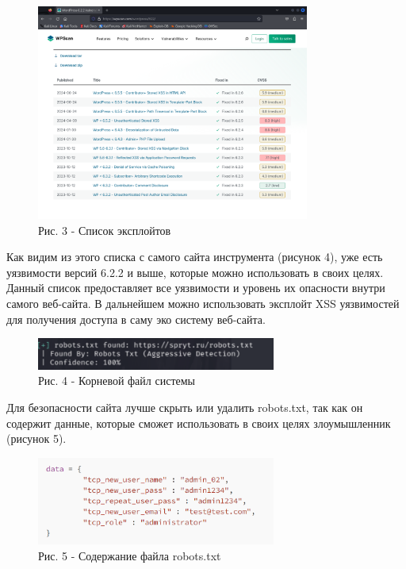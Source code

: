 \begin{figure}[H]
	\centering
	\includegraphics[width=0.8\textwidth]{media/ict/image36}
	\caption*{Рис. 3 - Список эксплойтов}
\end{figure}

\begin{multicols}{2}
Как видим из этого списка с самого сайта инструмента (рисунок 4), уже
есть уязвимости версий 6.2.2 и выше, которые можно использовать в своих
целях. Данный список предоставляет все уязвимости и уровень их опасности
внутри самого веб-сайта. В дальнейшем можно использовать эксплойт XSS
уязвимостей для получения доступа в саму эко систему веб-сайта.
\end{multicols}

\begin{figure}[H]
	\centering
	\includegraphics[width=0.7\textwidth]{media/ict/image37}
	\caption*{Рис. 4 - Корневой файл системы}
\end{figure}

\begin{multicols}{2}
Для безопасности сайта лучше скрыть или удалить robots.txt, так как он
содержит данные, которые сможет использовать в своих целях злоумышленник
(рисунок 5).
\end{multicols}

\begin{figure}[H]
	\centering
	\includegraphics[width=0.7\textwidth]{media/ict/image38}
	\caption*{Рис. 5 - Содержание файла robots.txt}
\end{figure}

